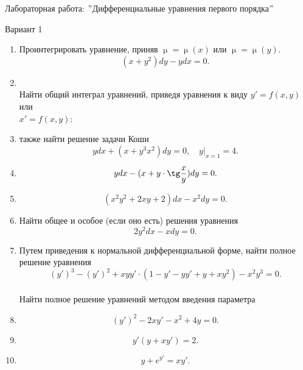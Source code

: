 \documentclass[a4paper, 12pt]{article}
\renewcommand{\mu}{\upmu}
\renewcommand{\mu}{\upmu}
\begin{document}
	\begin{center}
		\Large{Лабораторная работа: $"$Дифференциальные уравнения первого порядка$"$}
	\end{center}
\begin{center}
		\large{Вариант 1}
\end{center}
\begin{enumerate}
	\item Проинтегрировать уравнение, приняв $\mu = \mu(x)$ или $\mu = \mu (y)$. %
	$$(x+ y^2)dy - ydx = 0.$$
	\item  %
	\\Найти общий интеграл уравнений, приведя уравнения к виду $y' = f(x,y)$ или \\$x' = f(x,y)$: \item также найти решение задачи Коши $$ydx + (x + y^3x^2)dy = 0,\quad y|_{x = 1} = 4.$$ %
	\item $$ydx - (x + y\cdot \tg \dfrac{x}{y})dy = 0.$$ %
	\item$$(x^2y^2 + 2xy + 2)dx - x^2dy = 0.$$ %
	\item Найти общее и особое (если оно есть) решения уравнения $$2y^2dx - xdy = 0.$$
	\item Путем приведения к нормальной дифференциальной форме, найти полное решение уравнения $$(y')^3 -( y')^2 + xyy'\cdot(1 - y' - yy' + y + xy^2) - x^2y^3 = 0.$$\\
	 Найти полное решение уравнений методом введения параметра
	\item $$(y')^2-2xy' -x^2 + 4y = 0.$$
	\item $$y'(y+xy') = 2.$$
	\item $$y + e^{y'} = xy'.$$
\end{enumerate}
\end{document}

